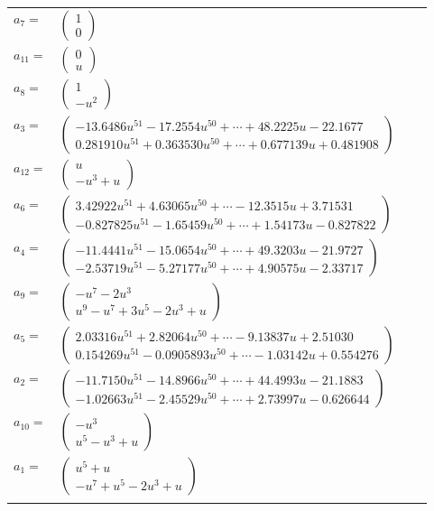 \documentclass[1p]{elsarticle_modified}
\theoremstyle{definition}
\begin{document}
\begin{tabular}{m{7pt} m{180pt} m{7pt} m{180pt} }
\flushright $a_{7}=$&$\begin{pmatrix}1\\0\end{pmatrix}$ \\
\flushright $a_{11}=$&$\begin{pmatrix}0\\u\end{pmatrix}$ \\
\flushright $a_{8}=$&$\begin{pmatrix}1\\- u^2\end{pmatrix}$ \\
\flushright $a_{3}=$&$\begin{pmatrix}-13.6486 u^{51}-17.2554 u^{50}+\cdots+48.2225 u-22.1677\\0.281910 u^{51}+0.363530 u^{50}+\cdots+0.677139 u+0.481908\end{pmatrix}$ \\
\flushright $a_{12}=$&$\begin{pmatrix}u\\- u^3+u\end{pmatrix}$ \\
\flushright $a_{6}=$&$\begin{pmatrix}3.42922 u^{51}+4.63065 u^{50}+\cdots-12.3515 u+3.71531\\-0.827825 u^{51}-1.65459 u^{50}+\cdots+1.54173 u-0.827822\end{pmatrix}$ \\
\flushright $a_{4}=$&$\begin{pmatrix}-11.4441 u^{51}-15.0654 u^{50}+\cdots+49.3203 u-21.9727\\-2.53719 u^{51}-5.27177 u^{50}+\cdots+4.90575 u-2.33717\end{pmatrix}$ \\
\flushright $a_{9}=$&$\begin{pmatrix}- u^7-2 u^3\\u^9- u^7+3 u^5-2 u^3+u\end{pmatrix}$ \\
\flushright $a_{5}=$&$\begin{pmatrix}2.03316 u^{51}+2.82064 u^{50}+\cdots-9.13837 u+2.51030\\0.154269 u^{51}-0.0905893 u^{50}+\cdots-1.03142 u+0.554276\end{pmatrix}$ \\
\flushright $a_{2}=$&$\begin{pmatrix}-11.7150 u^{51}-14.8966 u^{50}+\cdots+44.4993 u-21.1883\\-1.02663 u^{51}-2.45529 u^{50}+\cdots+2.73997 u-0.626644\end{pmatrix}$ \\
\flushright $a_{10}=$&$\begin{pmatrix}- u^3\\u^5- u^3+u\end{pmatrix}$ \\
\flushright $a_{1}=$&$\begin{pmatrix}u^5+u\\- u^7+u^5-2 u^3+u\end{pmatrix}$\\&\end{tabular}
\end{document}
